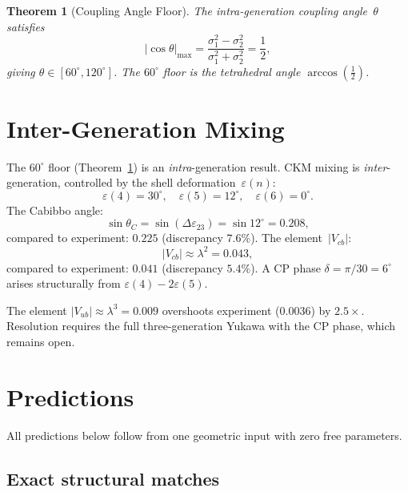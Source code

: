\documentclass[%
 aip,
 amsmath,amssymb,
 reprint,%
]{revtex4-1}
\newtheorem{theorem}{Theorem}
\newcommand{\half}{\tfrac{1}{2}}
\begin{document}
\begin{theorem}[Coupling Angle Floor]\label{thm:angle}
The intra-generation coupling angle~$\theta$ satisfies
\begin{equation}\label{eq:angle_floor}
|\cos\theta|_\mathrm{max}=\frac{\sigma_1^2-\sigma_2^2}{\sigma_1^2+\sigma_2^2}=\frac{1}{2},
\end{equation}
giving $\theta\in[60^\circ,120^\circ]$. The $60^\circ$ floor is the tetrahedral angle $\arccos(\half)$.
\end{theorem}


\section{\label{sec:mixing}Inter-Generation Mixing}

The $60^\circ$ floor (Theorem~\ref{thm:angle}) is an \emph{intra}-generation result. CKM mixing is \emph{inter}-generation, controlled by the shell deformation~$\varepsilon(n)$:
\begin{equation}\label{eq:epsilon}
\varepsilon(4)=30^\circ,\quad\varepsilon(5)=12^\circ,\quad\varepsilon(6)=0^\circ.
\end{equation}
The Cabibbo angle:
\begin{equation}\label{eq:cabibbo}
\sin\theta_C=\sin(\Delta\varepsilon_{23})=\sin12^\circ=0.208,
\end{equation}
compared to experiment: $0.225$ (discrepancy $7.6\%$). The element~$|V_{cb}|$:
\begin{equation}\label{eq:vcb}
|V_{cb}|\approx\lambda^2=0.043,
\end{equation}
compared to experiment: $0.041$ (discrepancy $5.4\%$).\cite{Wolfenstein} A CP phase $\delta=\pi/30=6^\circ$ arises structurally from $\varepsilon(4)-2\varepsilon(5)$.

The element $|V_{ub}|\approx\lambda^3=0.009$ overshoots experiment ($0.0036$) by $2.5\times$. Resolution requires the full three-generation Yukawa with the CP phase, which remains open.


\section{\label{sec:predictions}Predictions}

All predictions below follow from one geometric input with zero free parameters.

\subsection{Exact structural matches}
\end{document}
